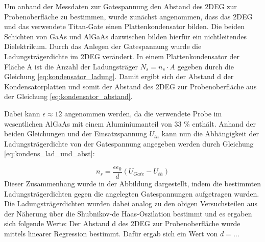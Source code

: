 

Um anhand der Messdaten zur Gatespannung den Abstand des 2DEG zur Probenoberfläche zu bestimmen, wurde zunächst angenommen, dass das 2DEG und das verwendete Titan-Gate einen Plattenkondensator bilden. Die beiden Schichten von GaAs und AlGaAs dazwischen bilden hierfür ein nichtleitendes Dielektrikum. 
Durch das Anlegen der Gatespannung wurde die Ladungsträgerdichte im 2DEG verändert. 
In einem Plattenkondensator der Fläche A ist die Anzahl der Ladungsträger $N_s=n_s \cdot A$ gegeben durch die Gleichung \ref{eq:kondensator_ladung}. 
Damit ergibt sich der Abstand d der Kondensatorplatten und somit der Abstand des 2DEG zur Probenoberfläche aus der Gleichung \ref{eq:kondensator_abstand}. 

Dabei kann $\epsilon \approx 12$ angenommen werden, da die verwendete Probe im wesentlichen AlGaAs mit einem Aluminiumanteil von 33 \% enthält.
Anhand der beiden Gleichungen %
und der Einsatzspannung $U_{th}$ kann nun die Abhängigkeit der Ladungsträgerdichte von der Gatespannung angegeben werden durch Gleichung \ref{eq:kondens_lad_und_abst}:

\begin{equation}
n_s=\frac{\epsilon \epsilon_0}{d}(U_{Gate}-U_{th})
\end{equation}
Dieser Zusammenhang wurde in der Abbildung %
dargestellt, indem die bestimmten Ladungsträgerdichten gegen die angelegten Gatespannungen aufgetragen wurden. 
Die Ladungsträgerdichten wurden dabei analog zu den obigen Versuchsteilen aus der Näherung über die Shubnikov-de Haas-Oszilation %
bestimmt und es ergaben sich folgende Werte: %
Der Abstand d des 2DEG zur Probenoberfläche wurde mittels linearer Regression bestimmt. Dafür ergab sich ein Wert von $d=...$ %



